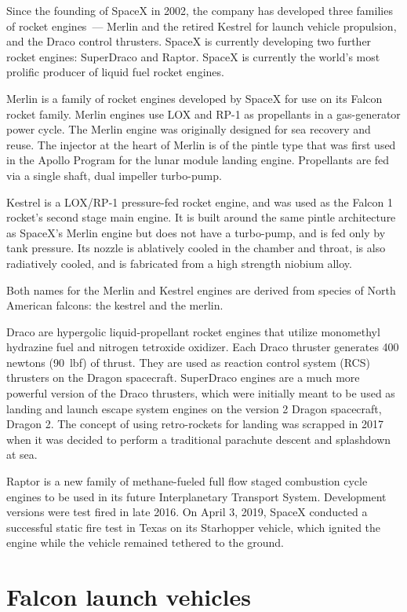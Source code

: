Since the founding of SpaceX in 2002, the company has developed three
families of rocket engines~--- Merlin and the retired Kestrel for launch
vehicle propulsion, and the Draco control thrusters. SpaceX is currently
developing two further rocket engines: SuperDraco and Raptor. SpaceX is
currently the world's most prolific producer of liquid fuel rocket
engines.

Merlin is a family of rocket engines developed by SpaceX for use on its
Falcon rocket family. Merlin engines use LOX and RP-1 as propellants in
a gas-generator power cycle. The Merlin engine was originally designed
for sea recovery and reuse. The injector at the heart of Merlin is of
the pintle type that was first used in the Apollo Program for the lunar
module landing engine. Propellants are fed via a single shaft, dual
impeller turbo-pump.

Kestrel is a LOX/RP-1 pressure-fed rocket engine, and was used as the
Falcon 1 rocket's second stage main engine. It is built around the same
pintle architecture as SpaceX's Merlin engine but does not have a
turbo-pump, and is fed only by tank pressure. Its nozzle is ablatively
cooled in the chamber and throat, is also radiatively cooled, and is
fabricated from a high strength niobium alloy.

Both names for the Merlin and Kestrel engines are derived from species
of North American falcons: the kestrel and the merlin.

Draco are hypergolic liquid-propellant rocket engines that utilize
monomethyl hydrazine fuel and nitrogen tetroxide oxidizer. Each Draco
thruster generates 400 newtons (90~lbf) of thrust. They are used as
reaction control system (RCS) thrusters on the Dragon spacecraft.
SuperDraco engines are a much more powerful version of the Draco
thrusters, which were initially meant to be used as landing and launch
escape system engines on the version 2 Dragon spacecraft, Dragon 2. The
concept of using retro-rockets for landing was scrapped in 2017 when it
was decided to perform a traditional parachute descent and splashdown at
sea.

Raptor is a new family of methane-fueled full flow staged combustion
cycle engines to be used in its future Interplanetary Transport System.
Development versions were test fired in late 2016. On April 3, 2019,
SpaceX conducted a successful static fire test in Texas on its
Starhopper vehicle, which ignited the engine while the vehicle remained
tethered to the ground.

\section{Falcon launch vehicles}\label{falcon-launch-vehicles}

